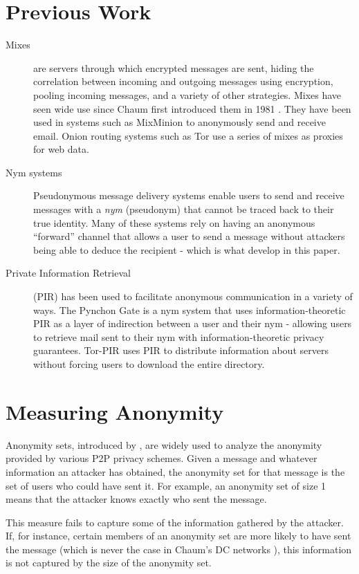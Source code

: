 \documentclass[twocolumn,11pt,english]{paper}
\begin{document}
\section{Previous Work}
\begin{description}
\item[Mixes] are servers through which encrypted messages are sent, hiding the correlation between incoming and outgoing messages using encryption, pooling incoming messages, and a variety of other strategies. Mixes have seen wide use since Chaum first introduced them in 1981 \cite{chaum-mix}. They have been used in systems such as MixMinion\cite{minion-design} to anonymously send and receive email. Onion routing systems such as Tor \cite{tor-design} use a series of mixes as proxies for web data. 

\item[Nym systems] Pseudonymous message delivery systems enable users to send and receive messages with a \textit{nym} (pseudonym) that cannot be traced back to their true identity. Many of these systems rely on having an anonymous ``forward'' channel that allows a user to send a message without attackers being able to deduce the recipient - which is what develop in this paper. 

\item[Private Information Retrieval] (PIR) has been used to facilitate anonymous communication in a variety of ways. The Pynchon Gate \cite{sassaman:wpes2005} is a nym system that uses information-theoretic PIR as a layer of indirection between a user and their nym - allowing users to retrieve mail sent to their nym with information-theoretic privacy guarantees. Tor-PIR \cite{MittalOTBG11} uses PIR to distribute information about servers without forcing users to download the entire directory. 

\end{description}

\section{Measuring Anonymity}
Anonymity sets, introduced by \cite{chaum-dc}, are widely used to analyze the anonymity provided by various P2P privacy schemes. Given a message and whatever information an attacker has obtained, the anonymity set for that message is the set of users who could have sent it. For example, an anonymity set of size 1 means that the attacker knows exactly who sent the message.

This measure fails to capture some of the information gathered by the attacker. If, for instance, certain members of an anonymity set are more likely to have sent the message (which is never the case in Chaum's DC networks \cite{chaum-dc}), this information is not captured by the size of the anonymity set. 
\end{document}

